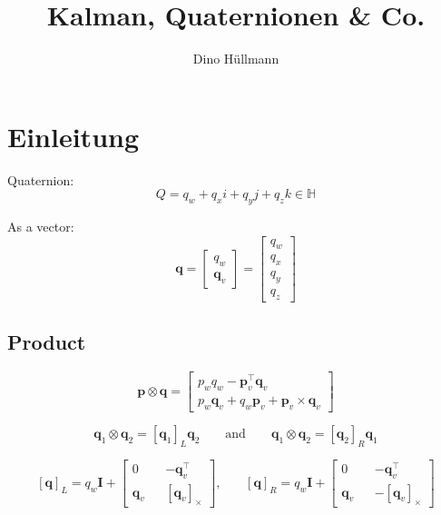 \documentclass[11pt,a4paper]{scrartcl}
\author{Dino Hüllmann}
\title{Kalman, Quaternionen & Co.}
\renewcommand\vec{\bm}
\newcommand{\quat}[1]{\mathbf{#1}}
\newcommand{\Matrix}[1]{\mathbf{#1}}
\newcommand{\skewop}[1]{\left[ #1 \right]_\times}
\newcommand{\qprod}{\otimes}
\begin{document}
\section{Einleitung}

Quaternion:
\begin{equation}
	Q = q_w + q_x i + q_y j + q_z k \in \mathbb{H}
\end{equation}

As a vector:
\begin{equation}
	\quat{q}
	=
	\begin{bmatrix}
		q_w \\ \vec{q}_v
	\end{bmatrix}
	=
	\begin{bmatrix}
		q_w \\ q_x \\ q_y \\ q_z
	\end{bmatrix}
\end{equation}

\subsection{Product}

\begin{equation}
	\quat{p} \qprod \quat{q}
	=
	\begin{bmatrix}
		p_w q_w - \vec{p}_v^\intercal \vec{q}_v \\
		p_w \vec{q}_v + q_w \vec{p}_v + \vec{p}_v \times \vec{q}_v
	\end{bmatrix}
\end{equation}

\begin{equation}
	\quat{q}_1 \qprod \quat{q}_2 = \left[\quat{q}_1\right]_L \quat{q}_2
	\qquad \text{and} \qquad
	\quat{q}_1 \qprod \quat{q}_2 = \left[\quat{q}_2\right]_R \quat{q}_1
\end{equation}

\begin{equation}
	\left[\quat{q}\right]_L
	=
	q_w \Matrix{I}
	+
	\begin{bmatrix}
		0 && -\quat{q}_v^\intercal \\
		\quat{q}_v && \skewop{\quat{q}_v}
	\end{bmatrix}\text{,}	
	\qquad
	\left[\quat{q}\right]_R
	=
	q_w \Matrix{I}
	+
	\begin{bmatrix}
	0 && -\quat{q}_v^\intercal \\
	\quat{q}_v && -\skewop{\quat{q}_v}
	\end{bmatrix}
\end{equation}
\end{document}
